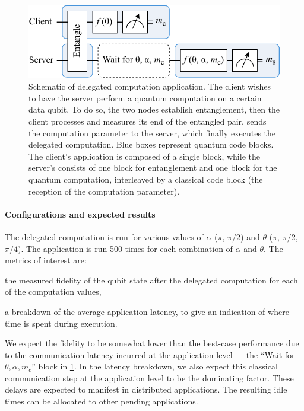 \begin{figure}[t]
    \centering
    \includegraphics[width=0.6\linewidth]{figures/del-comp.pdf}
    \caption{
        Schematic of delegated computation application. The client wishes to have the server perform
        a quantum computation on a certain data qubit. To do so, the two nodes establish
        entanglement, then the client processes and measures its end of the entangled pair, sends
        the computation parameter to the server, which finally executes the delegated computation.
        Blue boxes represent quantum code blocks. The client's application is composed of a single
        block, while the server's consists of one block for entanglement and one block for the
        quantum computation, interleaved by a classical code block (the reception of the computation
        parameter).
    }
    \label{fig:del-comp}
\end{figure}

\paragraph{Configurations and expected results}

The delegated computation is run for various values of $\alpha$ ($\pi$, $\pi/2$) and $\theta$
($\pi$, $\pi/2$, $\pi/4$). The application is run \num{500} times for each combination of $\alpha$
and $\theta$. The metrics of interest are:
%
\begin{inlinelist}
    \item the measured fidelity of the qubit state after the delegated computation for each of the
          computation values,
    \item a breakdown of the average application latency, to give an indication of where time is
          spent during execution.
\end{inlinelist}
We expect the fidelity to be somewhat lower than the best-case performance due to the communication
latency incurred at the application level --- the ``Wait for $\theta, \alpha, m_c$'' block in
\cref{fig:del-comp}. In the latency breakdown, we also expect this classical communication step at
the application level to be the dominating factor. These delays are expected to manifest in
distributed applications. The resulting idle times can be allocated to other pending applications.

